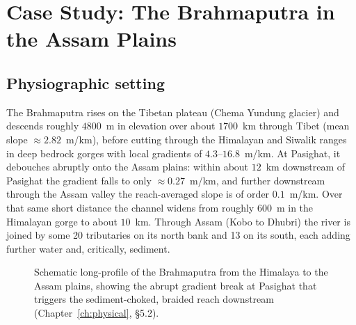 \documentclass[11pt,a4paper]{report}
\theoremstyle{definition}
\theoremstyle{plain}
\theoremstyle{remark}
\begin{document}
\chapter{Case Study: The Brahmaputra in the Assam Plains}
\label{ch:brahmaputra}

\section{Physiographic setting}
The Brahmaputra rises on the Tibetan plateau (Chema Yundung glacier) and descends roughly $4800$~m in elevation over about $1700$~km through Tibet (mean slope $\approx 2.82$~m/km), before cutting through the Himalayan and Siwalik ranges in deep bedrock gorges with local gradients of $4.3$--$16.8$~m/km. At Pasighat, it debouches abruptly onto the Assam plains: within about $12$~km downstream of Pasighat the gradient falls to only $\approx 0.27$~m/km, and further downstream through the Assam valley the reach-averaged slope is of order $0.1$~m/km. Over that same short distance the channel widens from roughly $600$~m in the Himalayan gorge to about $10$~km. Through Assam (Kobo to Dhubri) the river is joined by some 20 tributaries on its north bank and 13 on its south, each adding further water and, critically, sediment.

\begin{figure}[h!]
\centering
{}
\caption{Schematic long-profile of the Brahmaputra from the Himalaya to the Assam plains, showing the abrupt gradient break at Pasighat that triggers the sediment-choked, braided reach downstream (Chapter~\ref{ch:physical}, \S5.2).}
\label{fig:longprofile}
\end{figure}
\end{document}
